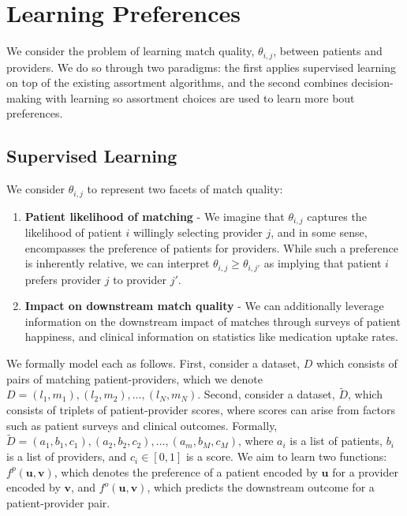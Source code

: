 \section{Learning Preferences}
\label{sec:learning}
We consider the problem of learning match quality, $\theta_{i,j}$, between patients and providers. 
We do so through two paradigms: the first applies supervised learning on top of the existing assortment algorithms, and the second combines decision-making with learning so assortment choices are used to learn more bout preferences. 

\subsection{Supervised Learning}
We consider $\theta_{i,j}$ to represent two facets of match quality: 
\begin{enumerate}
    \item \textbf{Patient likelihood of matching} - We imagine that $\theta_{i,j}$ captures the likelihood of patient $i$ willingly selecting provider $j$, and in some sense, encompasses the preference of patients for providers. While such a preference is inherently relative, we can interpret $\theta_{i,j} \geq \theta_{i,j'}$ as implying that patient $i$ prefers provider $j$ to provider $j'$. 
    \item \textbf{Impact on downstream match quality} - We can additionally leverage information on the downstream impact of matches through surveys of patient happiness, and clinical information on statistics like medication uptake rates. 
\end{enumerate}

We formally model each as follows. 
First, consider a dataset, $D$ which consists of pairs of matching patient-providers, which we denote $D = (l_{1},m_{1}),(l_{2},m_{2}),\ldots,(l_{N},m_{N})$. 
Second, consider a dataset, $\tilde{D}$, which consists of triplets of patient-provider scores, where scores can arise from factors such as patient surveys and clinical outcomes. 
Formally, $\tilde{D} = (a_{1},b_{1},c_{1}),(a_{2},b_{2},c_{2}),\ldots,(a_{m},b_{M},c_{M})$, where $a_{i}$ is a list of patients, $b_{i}$ is a list of providers, and $c_{i} \in [0,1]$ is a score. 
We aim to learn two functions: $f^{p}(\mathbf{u},\mathbf{v})$, which denotes the preference of a patient encoded by $\mathbf{u}$ for a provider encoded by $\mathbf{v}$, and $f^{o}(\mathbf{u},\mathbf{v})$, which predicts the downstream outcome for a patient-provider pair. 

